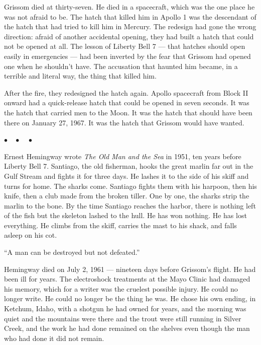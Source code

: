 \documentclass[12pt, letterpaper]{article}
\begin{document}
Grissom died at thirty-seven. He died in a spacecraft, which was the one place he was not afraid to be. The hatch that killed him in Apollo 1 was the descendant of the hatch that had tried to kill him in Mercury. The redesign had gone the wrong direction: afraid of another accidental opening, they had built a hatch that could not be opened at all. The lesson of Liberty Bell 7 --- that hatches should open easily in emergencies --- had been inverted by the fear that Grissom had opened one when he shouldn't have. The accusation that haunted him became, in a terrible and literal way, the thing that killed him.

After the fire, they redesigned the hatch again. Apollo spacecraft from Block II onward had a quick-release hatch that could be opened in seven seconds. It was the hatch that carried men to the Moon. It was the hatch that should have been there on January 27, 1967. It was the hatch that Grissom would have wanted.

\begin{center}
$\bullet\quad\bullet\quad\bullet$
\end{center}

Ernest Hemingway wrote \emph{The Old Man and the Sea} in 1951, ten years before Liberty Bell 7. Santiago, the old fisherman, hooks the great marlin far out in the Gulf Stream and fights it for three days. He lashes it to the side of his skiff and turns for home. The sharks come. Santiago fights them with his harpoon, then his knife, then a club made from the broken tiller. One by one, the sharks strip the marlin to the bone. By the time Santiago reaches the harbor, there is nothing left of the fish but the skeleton lashed to the hull. He has won nothing. He has lost everything. He climbs from the skiff, carries the mast to his shack, and falls asleep on his cot.

``A man can be destroyed but not defeated.''

Hemingway died on July 2, 1961 --- nineteen days before Grissom's flight. He had been ill for years. The electroshock treatments at the Mayo Clinic had damaged his memory, which for a writer was the cruelest possible injury. He could no longer write. He could no longer be the thing he was. He chose his own ending, in Ketchum, Idaho, with a shotgun he had owned for years, and the morning was quiet and the mountains were there and the trout were still running in Silver Creek, and the work he had done remained on the shelves even though the man who had done it did not remain.
\end{document}
